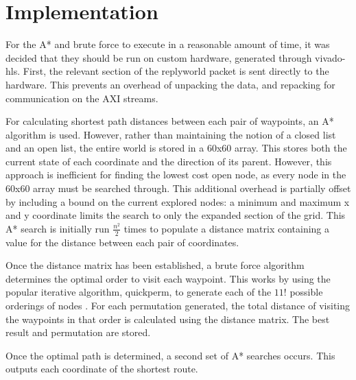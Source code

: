 \documentclass[a4paper, 11pt]{article}
\begin{document}
\section{Implementation} %
For the A* and brute force to execute in a reasonable amount of time, it was decided that
they should be run on custom hardware, generated through vivado-hls. 
First, the relevant section of the replyworld packet is sent directly to the
hardware. This prevents an overhead of unpacking the data, and repacking for
communication on the AXI streams. 
\par\bigskip\noindent
For calculating shortest path distances between each pair of
waypoints, an A* algorithm is used. However, rather than maintaining the notion of a
closed list and an open list, the entire world is stored in a 60x60 array. This
stores both the current state of each coordinate and the direction of
its parent. However, this approach is inefficient for finding the
lowest cost open node, as every node in the 60x60 array must be searched
through. This additional overhead is partially offset by including a bound on 
the current explored nodes: a minimum and maximum x and y coordinate limits the
search to only the expanded section of the grid. 
This A* search is initially run $\frac{n^2}{2}$ times to populate a distance
matrix containing a value for the distance between each pair of
coordinates.
\par\bigskip\noindent
Once the distance matrix has been established, a brute force algorithm
determines the optimal order to visit each waypoint. This works by using the
popular iterative algorithm, quickperm, to generate each of the $11!$ possible orderings of
nodes \cite{quickperm}. For each permutation generated, the total distance of
visiting the waypoints in that order is calculated using the distance
matrix. The best result and permutation are stored.
\par\bigskip\noindent
Once the optimal path is determined, a second set of A* searches occurs. This
outputs each coordinate of the shortest route.
\end{document}
